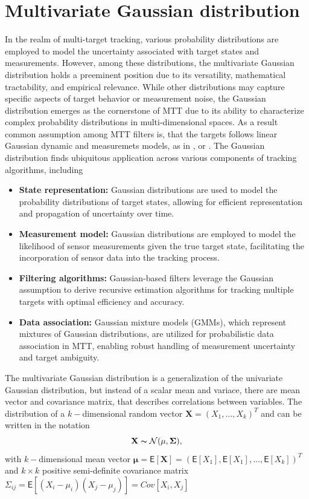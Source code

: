     \section{Multivariate Gaussian distribution}
In the realm of multi-target tracking, various probability distributions are employed to model the uncertainty associated with target states and measurements. However, among these distributions, the multivariate Gaussian distribution holds a preeminent position due to its versatility, mathematical tractability, and empirical relevance. While other distributions may capture specific aspects of target behavior or measurement noise, the Gaussian distribution emerges as the cornerstone of MTT due to its ability to characterize complex probability distributions in multi-dimensional spaces. As a result common assumption among MTT filters is, that the targets follows linear Gaussian dynamic and measuremets models, as in \cite{bar1995}, \cite{GarciaPMBM2018} or \cite{VoMaPHD2006}. The Gaussian distribution finds ubiquitous application across various components of tracking algorithms, including
\begin{itemize}
    \item \textbf{State representation:} Gaussian distributions are used to model the probability distributions of target states, allowing for efficient representation and propagation of uncertainty over time.
    \item \textbf{Measurement model:} Gaussian distributions are employed to model the likelihood of sensor measurements given the true target state, facilitating the incorporation of sensor data into the tracking process.
    \item \textbf{Filtering algorithms:} Gaussian-based filters leverage the Gaussian assumption to derive recursive estimation algorithms for tracking multiple targets with optimal efficiency and accuracy.
    \item \textbf{Data association:} Gaussian mixture models (GMMs), which represent mixtures of Gaussian distributions, are utilized for probabilistic data association in MTT, enabling robust handling of measurement uncertainty and target ambiguity.
\end{itemize}
\begin{note}
The multivariate Gaussian distribution is a generalization of the univariate Gaussian distribution, but instead of a scalar mean and variace, there are mean vector and covariance matrix, that describes correlations between variables. The distribution of a $k-$dimensional random vector $\mathbf{X} = (X_1,\dots,X_k)^T$ and can be written in the notation
\[\mathbf{X} \thicksim \mathcal{N}(\mathbf{\mu}, \mathbf{\Sigma}),\]
with
$k-$dimensional mean vector
$\mathbf{\mu} = \mathsf{E}[\mathbf{X}] = (\mathsf{E}[X_1], \mathsf{E}[X_1], \dots, \mathsf{E}[X_k])^T$
and
$k\times k$ positive semi-definite covariance matrix
$\mathsf{\Sigma}_{ij} = \mathsf{E}[(X_i - \mu_i)(X_j - \mu_j)] = Cov[X_i, X_j]$
\end{note}
